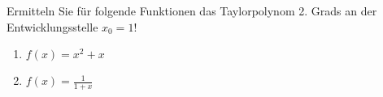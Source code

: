 \item Ermitteln Sie für folgende Funktionen das Taylorpolynom 2. Grads an der Entwicklungsstelle $x_0=1$!

\begin{multicols}{2}
\begin{enumerate}
\item $f(x) = x^2+x$
\item $f(x) = \frac{1}{1+x}$ 
\end{enumerate}
\end{multicols}

